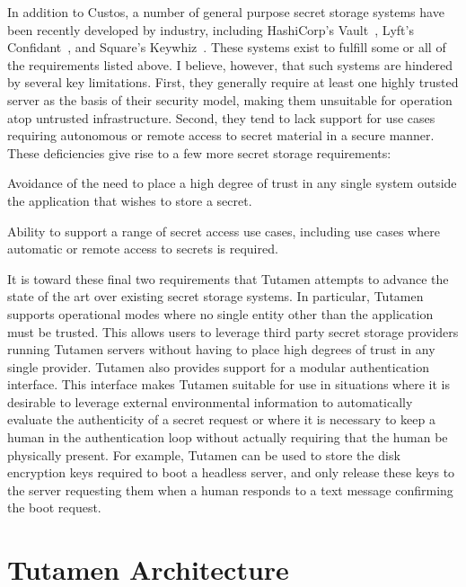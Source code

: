In addition to Custos, a number of general purpose secret storage
systems have been recently developed by industry, including
HashiCorp's Vault~\cite{vault}, Lyft's Confidant~\cite{confidant}, and
Square's Keywhiz~\cite{keywhiz}. These systems exist to fulfill some
or all of the requirements listed above. I believe, however, that such
systems are hindered by several key limitations. First, they generally
require at least one highly trusted server as the basis of their
security model, making them unsuitable for operation atop untrusted
infrastructure. Second, they tend to lack support for use cases
requiring autonomous or remote access to secret material in a secure
manner. These deficiencies give rise to a few more secret storage
requirements:

\begin{packed_item}
\item Avoidance of the need to place a high degree of trust in any
  single system outside the application that wishes to store a secret.
\item Ability to support a range of secret access use cases, including
  use cases where automatic or remote access to secrets is required.
\end{packed_item}

It is toward these final two requirements that Tutamen attempts to
advance the state of the art over existing secret storage systems. In
particular, Tutamen supports operational modes where no single entity
other than the application must be trusted. This allows users to
leverage third party secret storage providers running Tutamen servers
without having to place high degrees of trust in any single
provider. Tutamen also provides support for a modular authentication
interface. This interface makes Tutamen suitable for use in situations
where it is desirable to leverage external environmental information
to automatically evaluate the authenticity of a secret request or
where it is necessary to keep a human in the authentication loop
without actually requiring that the human be physically present. For
example, Tutamen can be used to store the disk encryption keys
required to boot a headless server, and only release these keys to the
server requesting them when a human responds to a text message
confirming the boot request.

\section{Tutamen Architecture}
\label{chap:tutamen:arch}

